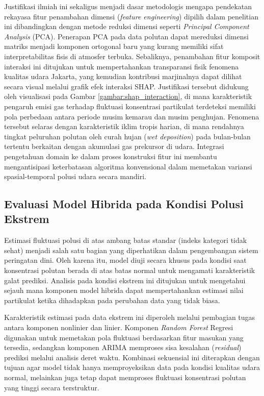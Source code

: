 Justifikasi ilmiah ini sekaligus menjadi dasar metodologis mengapa pendekatan rekayasa fitur penambahan dimensi (\textit{feature engineering}) dipilih dalam penelitian ini dibandingkan dengan metode reduksi dimensi seperti \textit{Principal Component Analysis} (PCA). Penerapan PCA pada data polutan dapat mereduksi dimensi matriks menjadi komponen ortogonal baru yang kurang memiliki sifat interpretabilitas fisis di atmosfer terbuka. Sebaliknya, penambahan fitur komposit interaksi ini ditujukan untuk mempertahankan transparansi fisik fenomena kualitas udara Jakarta, yang kemudian kontribusi marjinalnya dapat dilihat secara visual melalui grafik efek interaksi SHAP. Justifikasi tersebut didukung oleh visualisasi pada Gambar \ref{gambar:shap_interaction}, di mana karakteristik pengaruh emisi gas terhadap fluktuasi konsentrasi partikulat terdeteksi memiliki pola perbedaan antara periode musim kemarau dan musim penghujan. Fenomena tersebut selaras dengan karakteristik iklim tropis harian, di mana rendahnya tingkat peluruhan polutan oleh curah hujan (\textit{wet deposition}) pada bulan-bulan tertentu berkaitan dengan akumulasi gas prekursor di udara. Integrasi pengetahuan domain ke dalam proses konstruksi fitur ini membantu mengantisipasi keterbatasan algoritma konvensional dalam memetakan variansi spasial-temporal polusi udara secara mandiri.

\subsection{Evaluasi Model Hibrida pada Kondisi Polusi Ekstrem}

Estimasi fluktuasi polusi di atas ambang batas standar (indeks kategori tidak sehat) menjadi salah satu bagian yang diperhatikan dalam pengembangan sistem peringatan dini. Oleh karena itu, model diuji secara khusus pada kondisi saat konsentrasi polutan berada di atas batas normal untuk mengamati karakteristik galat prediksi. Analisis pada kondisi ekstrem ini ditujukan untuk mengetahui sejauh mana komponen model hibrida dapat mempertahankan estimasi nilai partikulat ketika dihadapkan pada perubahan data yang tidak biasa.

Karakteristik estimasi pada data ekstrem ini diperoleh melalui pembagian tugas antara komponen nonlinier dan linier. Komponen \textit{Random Forest} Regresi digunakan untuk memetakan pola fluktuasi berdasarkan fitur masukan yang tersedia, sedangkan komponen ARIMA memproses sisa kesalahan (\textit{residual}) prediksi melalui analisis deret waktu. Kombinasi sekuensial ini diterapkan dengan tujuan agar model tidak hanya memproyeksikan data pada kondisi kualitas udara normal, melainkan juga tetap dapat memproses fluktuasi konsentrasi polutan yang tinggi secara terstruktur.

